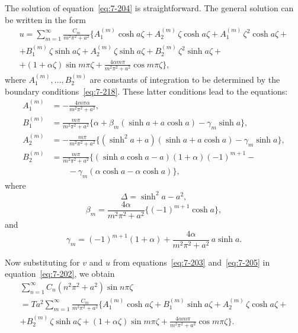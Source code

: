 The solution of equation~\eqref{eq:7-204} is straightforward.  The general
solution can be written in the form
\begin{multline}
\label{eq:7-205}
u = \sum_{m=1}^{\infty} \frac{C_m}{m^2\pi^2+a^2}
\biggl\{
A_1^{(m)}\cosh a\zeta + A_2^{(m)}\,\zeta\cosh a\zeta
+ A_1^{(m)}\,\zeta^2\cosh a\zeta + \\
+ B_1^{(m)}\,\zeta\sinh a\zeta
+ A_2^{(m)}\,\zeta\sinh a\zeta
+ B_2^{(m)}\,\zeta^2\sinh a\zeta + \\
+ (1+\alpha\zeta)\sin m\pi\zeta
+ \frac{4\alpha m\pi}{m^2\pi^2+a^2}\cos m\pi\zeta
\biggr\},
\end{multline}
where $A_1^{(m)}, \ldots, B_2^{(m)}$ are constants of integration to be
determined by the boundary conditions~\eqref{eq:7-218}.  These latter conditions lead to the equations:
\begin{align}
\label{eq:7-206}
A_1^{(m)} &= -\frac{4m\pi\alpha}{m^2\pi^2+a^2}, \nonumber\\[4pt]
B_1^{(m)} &= \frac{m\pi}{m^2\pi^2+a^2}
\{\alpha + \beta_m(\sinh a + a\cosh a) - \gamma_m\sinh a\}, \nonumber\\[4pt]
A_2^{(m)} &= -\frac{m\pi}{m^2\pi^2+a^2}
\{(\sinh^2 a + a)(\sinh a + a\cosh a) - \gamma_m \sinh a\}, \nonumber\\[4pt]
B_2^{(m)} &= \frac{m\pi}{m^2\pi^2+a^2}
\{(\sinh a\cosh a - a)(1 + \alpha)(-1)^{m+1} - \\
&\qquad -\gamma_m(\alpha\cosh a - \alpha\cosh a)\},
\end{align}
where
\begin{equation}
\label{eq:7-207}
\Delta = \sinh^2 a - a^2,
\end{equation}
\begin{equation}
\beta_m = \frac{4\alpha}{m^2\pi^2+a^2}\{(-1)^{m+1}\cosh a\},
\end{equation}
and
\begin{equation}
\gamma_m = (-1)^{m+1}(1+\alpha) + \frac{4\alpha}{m^2\pi^2+a^2}\, a\sinh a.
\end{equation}

Now substituting for $v$ and $u$ from equations~\eqref{eq:7-203} and~\eqref{eq:7-205} in equation~\eqref{eq:7-202}, we obtain
\begin{multline}
\label{eq:7-209}
\sum_{n=1}^{\infty} C_n(n^2\pi^2+a^2)\sin n\pi\zeta \\
= Ta^2 \sum_{m=1}^{\infty}\frac{C_m}{m^2\pi^2+a^2}
\biggl\{
A_1^{(m)}\cosh a\zeta + B_1^{(m)}\sinh a\zeta
+ A_2^{(m)}\,\zeta\cosh a\zeta + \\
+ B_2^{(m)}\,\zeta\sinh a\zeta
+ (1+\alpha\zeta)\sin m\pi\zeta
+ \frac{4\alpha m\pi}{m^2\pi^2+a^2}\cos m\pi\zeta
\biggr\}.
\end{multline}

